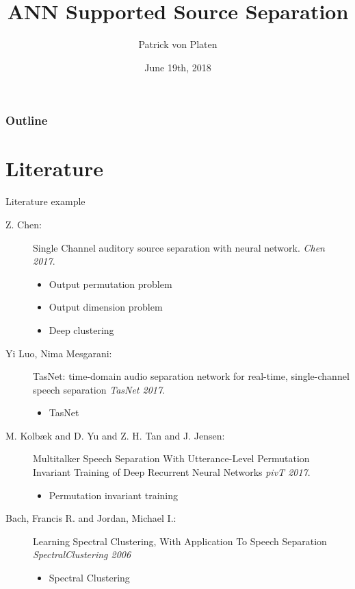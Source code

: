 \documentclass[xcolor=table,mathserif,9pt]{beamer}    %
\title[Seminar]{ANN Supported Source Separation}
\author[Patrick von Platen]{Patrick von Platen}
\institute[RWTH Aachen University] %
{
  \strut Human Language Technology and Pattern Recognition\\
  \strut Computer Science Department, RWTH Aachen University %
}
\date[19/6/2018]{June 19th, 2018}
\begin{document}
\begin{frame}[label=titlepage]
  \titlepage
\end{frame}

\begin{frame}
	\frametitle{Outline}
	\tableofcontents
\end{frame}






\section{Literature}%
\label{sec:literature}


\begin{frame}{Literature example}
\begin{description}
\item [Z. Chen:] Single Channel auditory source separation with neural network. {\em Chen 2017}.
  \begin{itemize}
  \item Output permutation problem  
  \item Output dimension problem 
  \item Deep clustering
  \end{itemize}
\item [Yi Luo, Nima Mesgarani:] TasNet: time-domain audio separation network for real-time, single-channel speech separation {\em TasNet 2017}.
  \begin{itemize}
  \item TasNet 
  \end{itemize}
\item [M. Kolbæk and D. Yu and Z. H. Tan and J. Jensen: ]Multitalker Speech Separation With Utterance-Level Permutation Invariant Training of Deep Recurrent Neural Networks {\em pivT 2017}.
  \begin{itemize}
  \item Permutation invariant training 
  \end{itemize}
\item [Bach, Francis R. and Jordan, Michael I.: ]Learning Spectral Clustering, With Application To Speech Separation {\em SpectralClustering 2006}
\begin{itemize}
	\item Spectral Clustering
\end{itemize}
\end{description}
\end{frame}
\end{document}
